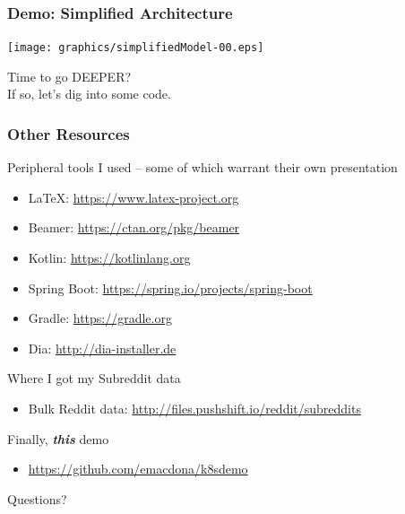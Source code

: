 \documentclass{beamer}
\begin{document}
\begin{frame}
    \frametitle{Demo: Simplified Architecture}
    \texttt{[image: graphics/simplifiedModel-00.eps]}
\end{frame}

\begin{frame}
    \begin{center}
        \Huge Time to go DEEPER?\\
        If so, let's dig into some code.
    \end{center}
\end{frame}

\begin{frame}
\frametitle{Other Resources}
Peripheral tools I used -- some of which warrant their own presentation
\begin{itemize}
    \item \LaTeX: \href{https://www.latex-project.org}{https://www.latex-project.org}
    \item Beamer: \href{https://ctan.org/pkg/beamer}{https://ctan.org/pkg/beamer}
    \item Kotlin: \href{https://kotlinlang.org}{https://kotlinlang.org}
    \item Spring Boot: \href{https://spring.io/projects/spring-boot}{https://spring.io/projects/spring-boot}
    \item Gradle: \href{https://gradle.org}{https://gradle.org}
    \item Dia: \href{http://dia-installer.de}{http://dia-installer.de}
\end{itemize}
\smallskip
Where I got my Subreddit data
\begin{itemize}
    \item Bulk Reddit data: \href{http://files.pushshift.io/reddit/subreddits}{http://files.pushshift.io/reddit/subreddits}
\end{itemize}
Finally, \textbf{\textit{this}} demo
\begin{itemize}
    \item \href{https://github.com/emacdona/k8sdemo}{https://github.com/emacdona/k8sdemo}
\end{itemize}
\end{frame}

\begin{frame}
    \begin{center}
        \Huge Questions?
    \end{center}
\end{frame}
\end{document}
